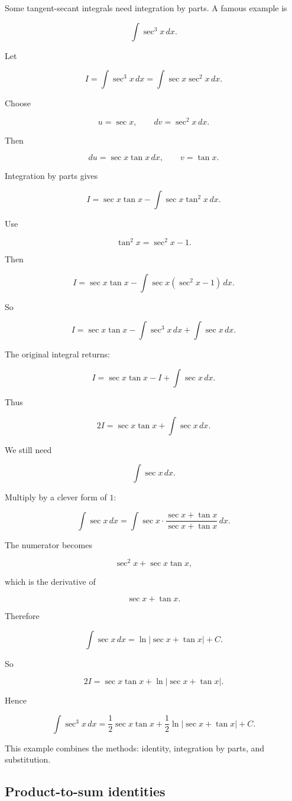 Some tangent-secant integrals need integration by parts.  A famous example is

\[
\int \sec^3 x\,dx.
\]

Let

\[
I=\int \sec^3 x\,dx
=
\int \sec x\sec^2 x\,dx.
\]

Choose

\[
u=\sec x,
\qquad
dv=\sec^2 x\,dx.
\]

Then

\[
du=\sec x\tan x\,dx,
\qquad
v=\tan x.
\]

Integration by parts gives

\[
I=\sec x\tan x-\int \sec x\tan^2 x\,dx.
\]

Use

\[
\tan^2 x=\sec^2 x-1.
\]

Then

\[
I
=
\sec x\tan x-\int \sec x(\sec^2 x-1)\,dx.
\]

So

\[
I
=
\sec x\tan x-\int \sec^3 x\,dx+\int \sec x\,dx.
\]

The original integral returns:

\[
I=\sec x\tan x-I+\int \sec x\,dx.
\]

Thus

\[
2I=\sec x\tan x+\int \sec x\,dx.
\]

We still need

\[
\int \sec x\,dx.
\]

Multiply by a clever form of \(1\):

\[
\int \sec x\,dx
=
\int \sec x\cdot\frac{\sec x+\tan x}{\sec x+\tan x}\,dx.
\]

The numerator becomes

\[
\sec^2 x+\sec x\tan x,
\]

which is the derivative of

\[
\sec x+\tan x.
\]

Therefore

\[
\int \sec x\,dx
=
\ln|\sec x+\tan x|+C.
\]

So

\[
2I=\sec x\tan x+\ln|\sec x+\tan x|.
\]

Hence

\[
\boxed{
\int \sec^3 x\,dx
=
\frac12\sec x\tan x+\frac12\ln|\sec x+\tan x|+C.
}
\]

This example combines the methods: identity, integration by parts, and substitution.

\subsection{Product-to-sum identities}
\label{subsec:product-to-sum-identities}

